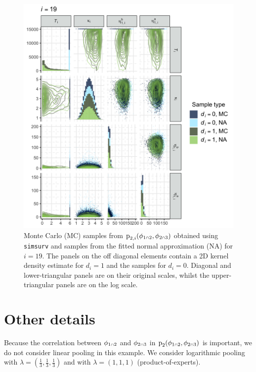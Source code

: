 \documentclass[
  10pt,
  a4paper,
]{article}
\let\Oldcap\cap
\renewcommand{\cap}{\mathrel{\mathsmaller{\Oldcap}}}
\newcommand{\pd}{\text{p}}
\begin{document}
\begin{figure}

{\centering \includegraphics{../plots/mimic-example/p3-prior-pairs/pairs-19} 

}

\caption{Monte Carlo (MC) samples from $\pd_{2, i}(\phi_{1 \cap 2}, \phi_{2 \cap 3})$ obtained using \texttt{simsurv} and samples from the fitted normal approximation (NA) for $i = 19$. The panels on the off diagonal elements contain a 2D kernel density estimate for $d_{i} = 1$ and the samples for $d_{i} = 0$. Diagonal and lower-triangular panels are on their original scales, whilst the upper-triangular panels are on the log scale.}\label{fig:surv_prior_plot_fit}
\end{figure}

\hypertarget{other-details}{%
\section{Other details}\label{other-details}}

Because the correlation between \(\phi_{1 \cap 2}\) and
\(\phi_{2 \cap 3}\) in \(\pd_{2}(\phi_{1 \cap 2}, \phi_{2 \cap 3})\) is
important, we do not consider linear pooling in this example. We
consider logarithmic pooling with
\(\lambda = (\frac{1}{3}, \frac{1}{3}, \frac{1}{3})\) and with
\(\lambda = (1, 1, 1)\) (product-of-experts).
\end{document}
